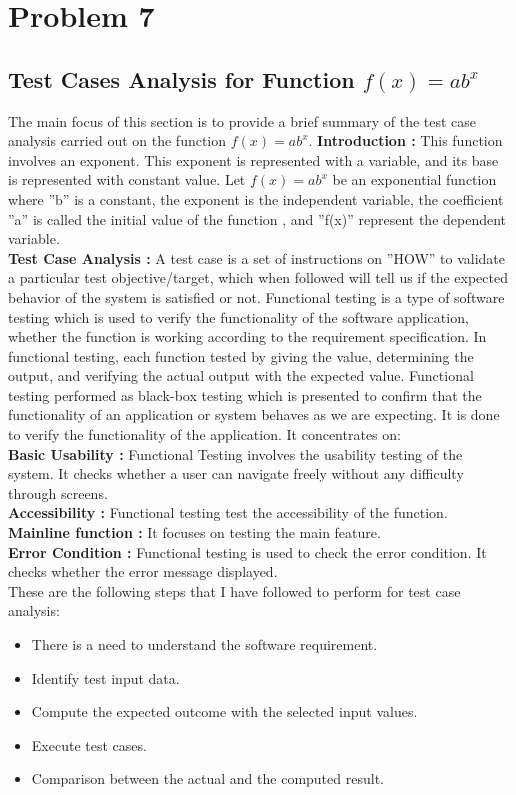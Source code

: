 \documentclass[12pt]{report}
\begin{document}
{\section{Problem 7}
\subsection{Test Cases Analysis for Function $f(x)=ab^x$}
\noindent The main focus of this section is to provide a brief summary of the test case analysis carried out on the function $f(x) = ab^x$.
\newline
\noindent\textbf{Introduction : }
This function involves an exponent. This exponent is represented with a variable, and its base is represented with constant value. Let $f(x) = ab^x$ be an exponential function where ''b'' is a constant, the exponent is the independent variable, the coefficient ''a'' is called the initial value of the function , and ''f(x)'' represent the dependent variable.
\\
\newline
\noindent\textbf{Test Case Analysis : }A test case is a set of instructions on ''HOW'' to validate a particular test objective/target, which when followed will tell us if the expected behavior of the system is satisfied or not.
Functional testing is a type of software testing which is used to verify the functionality of the software application, whether the function is working according to the requirement specification. In functional testing, each function tested by giving the value, determining the output, and verifying the actual output with the expected value. Functional testing performed as black-box testing which is presented to confirm that the functionality of an application or system behaves as we are expecting. It is done to verify the functionality of the application. It concentrates on:\\
\textbf{Basic Usability : }Functional Testing involves the usability testing of the system. It checks whether a user can navigate freely without any difficulty through screens.\\
\textbf{Accessibility : }Functional testing test the accessibility of the function.\\
\textbf{Mainline function : }It focuses on testing the main feature.\\
\textbf{Error Condition : }Functional testing is used to check the error condition. It checks whether the error message displayed.\\
These are the following steps that I have followed to perform for test case analysis:
\begin{itemize}
    \item There is a need to understand the software requirement.
    \item Identify test input data.
    \item Compute the expected outcome with the selected input values.
    \item Execute test cases.
    \item Comparison between the actual and the computed result.
\end{itemize}

}
\end{document}
